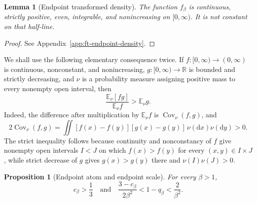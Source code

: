 \documentclass[10pt]{amsart}
\newtheorem{proposition}[proposition]{Proposition}
\newtheorem{lemma}[lemma]{Lemma}
\theoremstyle{definition}
\theoremstyle{remark}
\numberwithin{equation}{section}
\newcommand{\R}{\mathbb R}
\newcommand{\E}{\mathbb E}
\newcommand{\1}{\mathbf 1}
\begin{document}
\begin{lemma}[Endpoint transformed density]
\label{lem:ft-endpoint-density}
The function $f_\beta$ is continuous, strictly positive, even, integrable, and nonincreasing on $[0,\infty)$.  It is not constant on that half-line.
\end{lemma}

\begin{proof}
See Appendix~\ref{app:ft-endpoint-density}.
\end{proof}

We shall use the following elementary consequence twice. If $f:[0,\infty)\to(0,\infty)$ is continuous, nonconstant, and nonincreasing, $g:[0,\infty)\to\R$ is bounded and strictly decreasing, and $\nu$ is a probability measure assigning positive mass to every nonempty open interval, then
\begin{equation}
 \frac{\E_\nu[f g]}{\E_\nu f}>\E_\nu g.
 \label{eq:ft-strict-covariance}
\end{equation}
Indeed, the difference after multiplication by $\E_\nu f$ is $\operatorname{Cov}_\nu(f,g)$, and
\begin{equation*}
 2\operatorname{Cov}_\nu(f,g)
 =\iint[f(x)-f(y)][g(x)-g(y)]\,\nu(\mathrm d x)\nu(\mathrm d y)>0.
\end{equation*}
The strict inequality follows because continuity and nonconstancy of $f$ give nonempty open intervals $I<J$ on which $f(x)>f(y)$ for every $(x,y)\in I\times J$, while strict decrease of $g$ gives $g(x)>g(y)$ there and $\nu(I)\nu(J)>0$.

\begin{proposition}[Endpoint atom and endpoint scale]
\label{prop:ft-endpoint-quantitative}
For every $\beta>1$,
\begin{equation}
 c_\beta>\frac13
 \quad\text{and}\quad
 \frac{3-c_\beta}{2\beta^2}<1-q_\beta<\frac2{\beta^2}.
 \label{eq:ft-endpoint-quantitative}
\end{equation}
\end{proposition}
\end{document}
